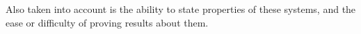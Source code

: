 Also taken into account is the ability to state properties of these systems,
and the ease or difficulty of proving results about them.




%

